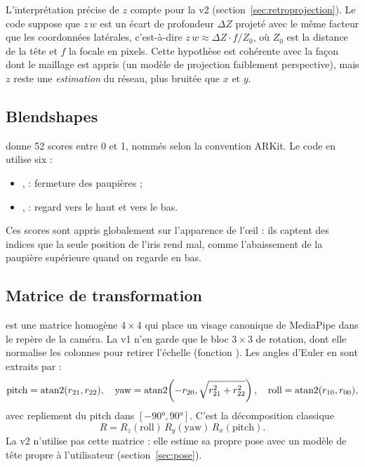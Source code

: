 L'interprétation précise de $z$ compte pour la v2 (section~\ref{sec:retroprojection}). Le code suppose que $z\,w$ est un écart de profondeur $\Delta Z$ projeté avec le même facteur que les coordonnées latérales, c'est-à-dire $z\,w \approx \Delta Z \cdot f / Z_0$, où $Z_0$ est la distance de la tête et $f$ la focale en pixels. Cette hypothèse est cohérente avec la façon dont le maillage est appris (un modèle de projection faiblement perspective), mais $z$ reste une \emph{estimation} du réseau, plus bruitée que $x$ et $y$.

\subsection{Blendshapes}

 donne 52 scores entre 0 et 1, nommés selon la convention ARKit. Le code en utilise six :
\begin{itemize}
  \item {},  : fermeture des paupières ;
  \item {},  : regard vers le haut et vers le bas.
\end{itemize}
Ces scores sont appris globalement sur l'apparence de l'œil : ils captent des indices que la seule position de l'iris rend mal, comme l'abaissement de la paupière supérieure quand on regarde en bas.

\subsection{Matrice de transformation}

 est une matrice homogène $4\times4$ qui place un visage canonique de MediaPipe dans le repère de la caméra. La v1 n'en garde que le bloc $3\times3$ de rotation, dont elle normalise les colonnes pour retirer l'échelle (fonction ). Les angles d'Euler en sont extraits par :
\begin{equation}
\text{pitch} = \operatorname{atan2}(r_{21}, r_{22}), \quad
\text{yaw} = \operatorname{atan2}\!\left(-r_{20}, \sqrt{r_{21}^2 + r_{22}^2}\right), \quad
\text{roll} = \operatorname{atan2}(r_{10}, r_{00}),
\end{equation}
avec repliement du pitch dans $[-\ang{90}, \ang{90}]$. C'est la décomposition classique \[ R = R_z(\text{roll})\,R_y(\text{yaw})\,R_x(\text{pitch}). \] La v2 n'utilise pas cette matrice : elle estime sa propre pose avec un modèle de tête propre à l'utilisateur (section~\ref{sec:pose}).

